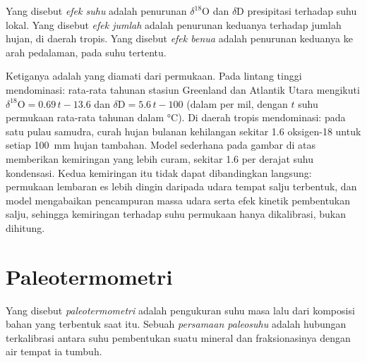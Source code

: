 \begin{definition}\label{def:b3:stable-isotopes:effects}
Yang disebut \emph{efek suhu} adalah
penurunan $\delta^{18}\mathrm O$ dan $\delta\mathrm D$ presipitasi terhadap
suhu lokal. Yang disebut \emph{efek jumlah} adalah
penurunan keduanya terhadap jumlah hujan, di daerah tropis. Yang disebut \emph{efek
benua} adalah penurunan keduanya ke arah pedalaman, pada
suhu tertentu.
\end{definition}

Ketiganya adalah  yang diamati dari permukaan. Pada lintang tinggi
 mendominasi: rata-rata tahunan stasiun Greenland dan Atlantik
Utara mengikuti $\delta^{18}\mathrm O = 0.69\,t - 13.6$ dan $\delta\mathrm D =
5.6\,t - 100$ (dalam per mil, dengan $t$ suhu permukaan rata-rata tahunan dalam
\unit{\celsius}). Di daerah tropis  mendominasi: pada satu
pulau samudra, curah hujan bulanan kehilangan sekitar \qty{1.6}{\permil} oksigen-18 untuk setiap
\qty{100}{mm} hujan tambahan. Model sederhana pada gambar di atas memberikan kemiringan yang lebih curam,
sekitar \qty{1.6}{\permil} per derajat suhu kondensasi. Kedua kemiringan
itu tidak dapat dibandingkan langsung: permukaan lembaran es lebih dingin
daripada udara tempat salju terbentuk, dan model mengabaikan pencampuran massa
udara serta efek kinetik pembentukan salju, sehingga kemiringan terhadap suhu
permukaan hanya dikalibrasi, bukan dihitung.

\section{Paleotermometri}\label{sec:b3:stable-isotopes:palaeothermometry}

\begin{definition}
\label{def:b3:stable-isotopes:palaeothermometry}
Yang disebut \emph{paleotermometri} adalah pengukuran suhu masa lalu
dari komposisi bahan yang terbentuk saat itu. Sebuah
\emph{persamaan paleosuhu} adalah
hubungan terkalibrasi antara suhu pembentukan suatu mineral dan
fraksionasinya dengan air tempat ia tumbuh.
\end{definition}

